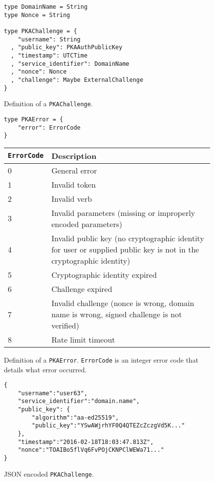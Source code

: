 \documentclass{article}
\newcommand{\todo}[1]{\textcolor{red}{#1}}
\begin{document}
\begin{figure}
\begin{lstlisting}
type DomainName = String
type Nonce = String

type PKAChallenge = {
    "username": String
  , "public_key": PKAAuthPublicKey
  , "timestamp": UTCTime
  , "service_identifier": DomainName
  , "nonce": Nonce
  , "challenge": Maybe ExternalChallenge
}
\end{lstlisting}
\caption{Definition of a \texttt{PKAChallenge}.}
\label{code:pkachallenge}
\end{figure}

\begin{figure}
\begin{lstlisting}
type PKAError = {
    "error": ErrorCode
}
\end{lstlisting}
\begin{tabular}{| l | p{14cm} |}
\hline
\texttt{ErrorCode} & Description \\
\hline
0 & General error \\
1 & Invalid token \\
2 & Invalid verb \\
3 & Invalid parameters (missing or improperly encoded parameters) \\
4 & Invalid public key (no cryptographic identity for user or supplied public key is not in the cryptographic identity) \\
5 & Cryptographic identity expired \\
6 & Challenge expired \\
7 & Invalid challenge (nonce is wrong, domain name is wrong, signed challenge is not verified) \\
8 & Rate limit timeout \\
\hline
\end{tabular}
\caption{Definition of a \texttt{PKAError}. \texttt{ErrorCode} is an integer error code that details what error occurred.}
\label{code:pkaerror}
\end{figure}





\begin{figure}
\begin{lstlisting}
{
    "username":"user63",
    "service_identifier":"domain.name",
    "public_key": {
        "algorithm":"aa-ed25519",
        "public_key":"YSwAWjrhYF0Q4QTEZcZczgVd5K..."
    },
    "timestamp":"2016-02-18T18:03:47.813Z",
    "nonce":"TOAIBo5flVq6FvPOjCKNPClWEWa71..."
}
\end{lstlisting}
\caption{JSON encoded \texttt{PKAChallenge}.}
\label{code:pkachallengejson}
\end{figure}
\end{document}
